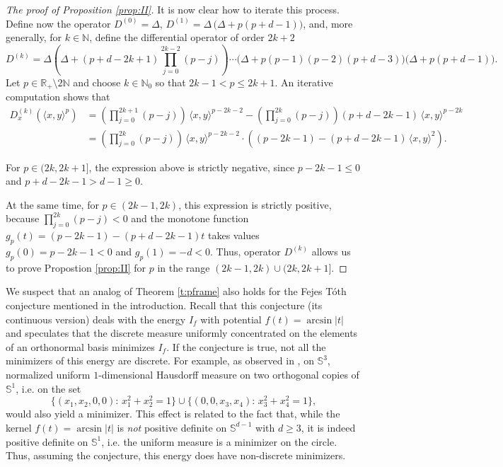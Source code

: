 \documentclass[11pt, leqno]{amsart}
\def\S{\mathbb S}
\theoremstyle{definition}
\numberwithin{equation}{section}
\begin{document}
\begin{proof}[The proof of Proposition \ref{prop:II}]
It is now clear how to iterate this process. 
  Define now the operator $D^{(0)} = \Delta$, $D^{(1)} = \Delta \, \big( \Delta +  p (p+d -1) \big)$, and, more generally, for $k\in \mathbb N$, define the differential operator of order $2k+2$ 
\begin{equation}\label{e.4.21}
D^{(k)}  = \Delta  \left( \Delta + (p+d-2k+1) \prod_{j=0}^{2k-2} (p-j) \right) \cdots \Bigg( \Delta + p (p-1) (p-2) ( p+d-3) \Bigg) \big( \Delta  + p ( p+d-1) \big).
\end{equation} 
Let $p \in \mathbb R_+\setminus 2 \mathbb N$ and choose $k \in \mathbb N_0$ so that $2k-1 <p \le  2k+1$. An iterative computation  shows that 
\begin{equation}\label{e.4.22}
\begin{aligned}
 D^{(k)}_x   \left(  \langle x, y \rangle^p \right) & = \left( \prod_{j=0}^{2k+1} (p-j)\right) \,  \langle x, y \rangle^{p-2k-2} - \left( \prod_{j=0}^{2k} (p-j)\right) (p + d -  2k -1)\,  \langle x, y \rangle^{p-2k} \\ 
 & = \left( \prod_{j=0}^{2k} (p-j)\right) \,  \langle x, y \rangle^{p-2k-2} \cdot \left(  (p- 2k-1)  - (p + d -  2k -1 )\,  \langle x, y \rangle^{2} \right) .
 \end{aligned}
\end{equation} 

For $p\in (2k, 2k+1]$, the expression above is strictly negative, since  $p- 2k -1 \le 0 $ and $p+ d- 2k -1 > d-1 \ge 0$. 

At the same time, for $p \in (2k-1, 2k)$, this expression is strictly positive, because  $\prod_{j=0}^{2k} (p-j) < 0 $ and the monotone function $g_p (t) =  (p- 2k-1)  - (p + d -  2k -1 )t $ takes values $g_p (0) = p - 2k-1 <0$ and $g_p (1) = - d <0$. Thus, operator $D^{(k)}$ allows us to prove Propostion \ref{prop:II} for $p$ in the range $ (2k-1,2k) \cup (2k, 2k+1]$.
\end{proof}



We suspect that an analog of Theorem \ref{t:pframe} also holds for the Fejes T\'oth conjecture \cite{FT} mentioned in the introduction. Recall that this conjecture (its continuous version) deals with the energy $I_f$ with potential $f(t) = \arcsin |t|$ and speculates that the discrete measure uniformly concentrated on the elements of an orthonormal basis minimizes $I_f$. If   the conjecture is true, not all the  minimizers of this energy are discrete. For example, as observed  in \cite{BM}, on $\S^3$,  normalized uniform $1$-dimensional Hausdorff measure on two orthogonal copies of $\S^1$, i.e. on the set $$ \{ (x_1, x_2, 0,0 ):\, x_1^2 +x_2^2 =1 \} \cup  \{ (0,0,x_3, x_4  ):\, x_3^2 +x_4^2 =1 \}, $$ would also yield a minimizer. This effect is related to the fact that, while the kernel $f(t) = \arcsin |t|$ is  {\em{not}} positive definite on $\S^{d-1}$ with $d\ge 3$, it is indeed positive definite on $\S^1$, i.e. the uniform measure is a minimizer on the circle. Thus, assuming the conjecture, this energy does have non-discrete minimizers.  
\end{document}
